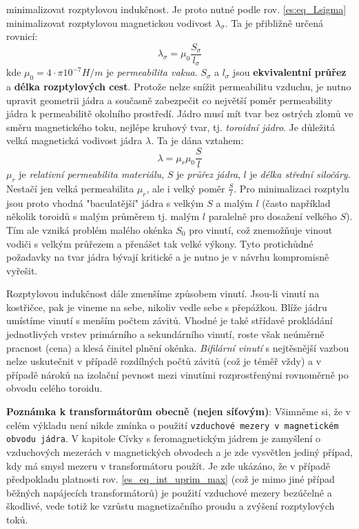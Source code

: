 {    minimalizovat rozptylovou indukčnost. Je proto nutné podle rov. \ref{es:eq_Lsigma} 
    minimalizovat rozptylovou magnetickou vodivost $\lambda_\sigma$. Ta je přibližně určená rovnicí:
    \begin{equation}\label{es:eq_rozptyl_vodivost}
      \lambda_\sigma= \mu_0\frac{S_\sigma}{l_\sigma}
    \end{equation}
    kde $\mu_0=4\cdot\pi10^{-7}H/m$ je \emph{permeabilita vakua}. $S_\sigma$ a $l_\sigma$ jsou
    \textbf{ekvivalentní průřez} a \textbf{délka rozptylových cest}. Protože nelze snížit  
    permeabilitu vzduchu, je nutno upravit geometrii jádra a současně zabezpečit co největší poměr 
    permeability jádra k permeabilitě okolního prostředí. Jádro musí mít tvar bez ostrých zlomů ve 
    směru magnetického toku, nejlépe kruhový tvar, tj. \emph{toroidní jádro}. Je důležitá velká 
    magnetická vodivost jádra $\lambda$. Ta je dána vztahem:
    \begin{equation}\label{es:eq_vodivost_jadra}
      \lambda= \mu_r\mu_0\frac{S}{l}
    \end{equation}
    $\mu_r$ je \emph{relativní permeabilita materiálu}, $S$ je \emph{průřez jádra}, $l$ je 
    \emph{délka střední siločáry}. Nestačí jen velká permeabilita  $\mu_r$, ale i velký poměr 
    $\frac{S}{l}$. Pro minimalizaci rozptylu jsou proto vhodná "baculatější" jádra s velkým $S$ a 
    malým $l$ (často například několik toroidů s malým průměrem tj. malým $l$ paralelně pro 
    dosažení velkého $S$). Tím ale vzniká problém malého okénka $S_0$ pro vinutí, což znemožňuje 
    vinout vodiči s velkým průřezem a přenášet tak velké výkony. Tyto protichůdné požadavky na tvar 
    jádra bývají kritické a je nutno je v návrhu kompromisně vyřešit.

    Rozptylovou indukčnost dále zmenšíme způsobem vinutí. Jsou-li vinutí na kostřičce, pak je 
    vineme na sebe, nikoliv vedle sebe s přepážkou. Blíže jádru umístíme vinutí s menším počtem 
    závitů. Vhodné je také střídavé prokládání jednotlivých vrstev primárního a sekundárního 
    vinutí, roste však neúměrně pracnost (cena) a klesá činitel plnění okénka. \emph{Bifilární 
    vinutí} s nejtěsnější vazbou nelze uskutečnit v případě rozdílných počtů závitů (což je téměř 
    vždy) a v případě nároků na izolační pevnost mezi vinutími rozprostřenými rovnoměrně po obvodu 
    celého toroidu.

    \begin{note}
      \textbf{Poznámka k transformátorům obecně (nejen síťovým)}:
      \newline Všimněme si, že v celém výkladu není nikde zmínka o použití \texttt{vzduchové mezery 
      v 
      magnetickém obvodu jádra}. V kapitole Cívky s feromagnetickým jádrem je zamyšlení o 
      vzduchových mezerách v magnetických obvodech a je zde vysvětlen jediný případ, kdy má smysl 
      mezeru v transformátoru použít. Je zde ukázáno, že v případě předpokladu platnosti rov. 
      \ref{es_eq_int_uprim_max} (což je mimo jiné případ běžných napájecích transformátorů) je 
      použití vzduchové mezery bezúčelné a škodlivé, vede totiž ke vzrůstu magnetizačního proudu a 
      zvýšení rozptylových toků.
    \end{note}

}
